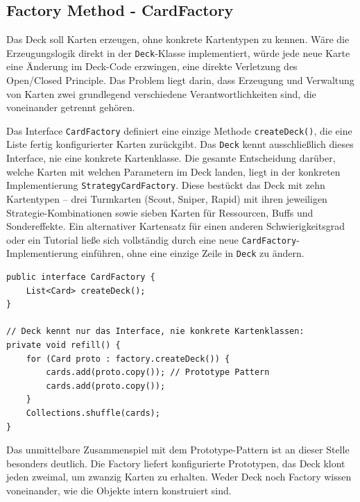 \subsection{Factory Method - CardFactory}

Das Deck soll Karten erzeugen, ohne konkrete Kartentypen zu kennen. Wäre die
Erzeugungslogik direkt in der \texttt{Deck}-Klasse implementiert, würde jede
neue Karte eine Änderung im Deck-Code erzwingen, eine direkte Verletzung des
Open/Closed Principle. Das Problem liegt darin, dass Erzeugung und Verwaltung
von Karten zwei grundlegend verschiedene Verantwortlichkeiten sind, die
voneinander getrennt gehören.

Das Interface \texttt{CardFactory} definiert eine einzige Methode
\texttt{createDeck()}, die eine Liste fertig konfigurierter Karten zurückgibt.
Das \texttt{Deck} kennt ausschließlich dieses Interface, nie eine konkrete
Kartenklasse. Die gesamte Entscheidung darüber, welche Karten mit welchen
Parametern im Deck landen, liegt in der konkreten Implementierung
\texttt{StrategyCardFactory}. Diese bestückt das Deck mit zehn Kartentypen --
drei Turmkarten (Scout, Sniper, Rapid) mit ihren jeweiligen Strategie-Kombinationen
sowie sieben Karten für Ressourcen, Buffs und Sondereffekte. Ein alternativer
Kartensatz für einen anderen Schwierigkeitsgrad oder ein Tutorial ließe sich
vollständig durch eine neue \texttt{CardFactory}-Implementierung einführen, ohne
eine einzige Zeile in \texttt{Deck} zu ändern.

\begin{lstlisting}[caption={Factory-Interface und Nutzung im Deck},label=lst:factory]
public interface CardFactory {
    List<Card> createDeck();
}

// Deck kennt nur das Interface, nie konkrete Kartenklassen:
private void refill() {
    for (Card proto : factory.createDeck()) {
        cards.add(proto.copy()); // Prototype Pattern
        cards.add(proto.copy());
    }
    Collections.shuffle(cards);
}
\end{lstlisting}

Das unmittelbare Zusammenspiel mit dem Prototype-Pattern ist an dieser Stelle
besonders deutlich. Die Factory liefert konfigurierte Prototypen, das Deck klont
jeden zweimal, um zwanzig Karten zu erhalten. Weder Deck noch Factory wissen
voneinander, wie die Objekte intern konstruiert sind.

